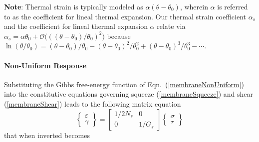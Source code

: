 \textbf{Note}: Thermal strain is typically modeled as $\alpha (\theta - \theta_0)$, wherein $\alpha$ is referred to as the coefficient for lineal thermal expansion.  Our thermal strain coefficient $\alpha_s$ and the coefficient for lineal thermal expansion $\alpha$ relate via $\alpha_s = \alpha \theta_0 + \mathcal{O}\bigl( ((\theta - \theta_0) / \theta_0)^2 \bigr)$ because $\ln ( \theta / \theta_0 ) = (\theta - \theta_0) / \theta_0 - (\theta - \theta_0)^2 / \theta_0^2 + (\theta - \theta_0)^3 / \theta_0^3 - \cdots$.

\paragraph{Non-Uniform Response}

Substituting the Gibbs free-energy function of Eqn.~(\ref{membraneNonUniform}) into the constitutive equations governing squeeze (\ref{membraneSqueeze}) and shear (\ref{membraneShear}) leads to the following matrix equation
\begin{displaymath}
    \left\{ \begin{matrix}
        \varepsilon \\ \gamma 
    \end{matrix} \right\} = \begin{bmatrix}
        1 / 2 N_s & 0 \\ 0 & 1 / G_s
    \end{bmatrix} \left\{ \begin{matrix}
        \sigma \\ \tau
    \end{matrix} \right\}
\end{displaymath}
that when inverted becomes
